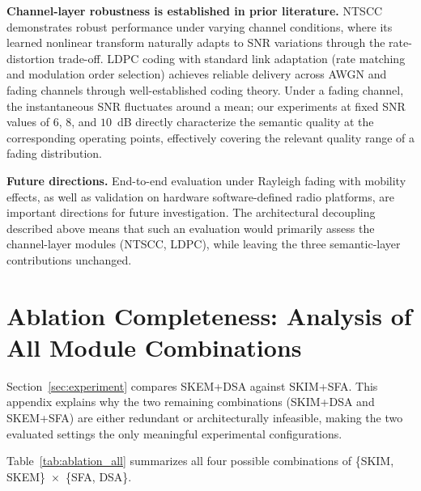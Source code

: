 \documentclass[10pt,journal]{IEEEtran}
\begin{document}
\textbf{Channel-layer robustness is established in prior literature.}
NTSCC~\cite{NTSCC} demonstrates robust performance under varying channel conditions, where its learned nonlinear transform naturally adapts to SNR variations through the rate-distortion trade-off. LDPC coding with standard link adaptation (rate matching and modulation order selection) achieves reliable delivery across AWGN and fading channels through well-established coding theory. Under a fading channel, the instantaneous SNR fluctuates around a mean; our experiments at fixed SNR values of $6$, $8$, and $10$~dB directly characterize the semantic quality at the corresponding operating points, effectively covering the relevant quality range of a fading distribution.

\textbf{Future directions.}
End-to-end evaluation under Rayleigh fading with mobility effects, as well as validation on hardware software-defined radio platforms, are important directions for future investigation. The architectural decoupling described above means that such an evaluation would primarily assess the channel-layer modules (NTSCC, LDPC), while leaving the three semantic-layer contributions unchanged.

\section{Ablation Completeness: Analysis of All Module Combinations}
\label{appendix:ablation}

Section~\ref{sec:experiment} compares SKEM+DSA against SKIM+SFA. This appendix explains why the two remaining combinations (SKIM+DSA and SKEM+SFA) are either redundant or architecturally infeasible, making the two evaluated settings the only meaningful experimental configurations.

Table~\ref{tab:ablation_all} summarizes all four possible combinations of \{SKIM, SKEM\}~$\times$~\{SFA, DSA\}.
\end{document}
